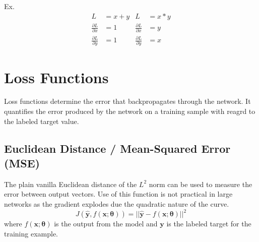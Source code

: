 Ex.
\begin{align*}
L &= x + y			&		L &= x * y \\
\frac{\partial L}{\partial x} &= 1 & \frac{\partial L}{\partial x} &= y\\
\frac{\partial L}{\partial y} &= 1 & \frac{\partial L}{\partial y} &= x
\end{align*}

\section{Loss Functions}

Loss functions determine the error that backpropagates through the network. It quantifies the error produced by the network on a training sample with reagrd to the labeled target value.

\subsection*{Euclidean Distance / Mean-Squared Error (MSE)}
The plain vanilla Euclidean distance of the $L^2$ norm can be used to measure the error between output vectors. Use of this function is not practical in large networks as the gradient explodes due the quadratic nature of the curve.
\begin{equation}
J(\hat{\bm{y}},f(\bm{x};\bm{\theta})) = ||\hat{\bm{y}} - f(\bm{x};\bm{\theta})||^{2}
\end{equation}
where $f(\bm{x};\bm{\theta})$ is the output from the model and $\bm{y}$ is the labeled target for the training example.





